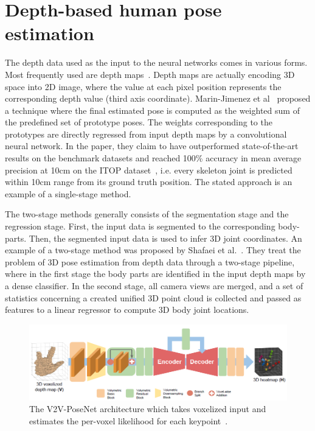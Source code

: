 \section{Depth-based human pose estimation}
\noindent The depth data used as the input to the neural networks comes in various forms. Most frequently used are depth maps~\cite{Malik2018StructureAware3H,Marin18jvcir,inproceedings,Xiong_2019_ICCV}. Depth maps are actually encoding 3D space into 2D image, where the value at each pixel position represents the corresponding depth value (third axis coordinate). Marin-Jimenez et al~\cite{Marin18jvcir} proposed a technique where the final estimated pose is computed as the weighted sum of the predefined set of prototype poses. The weights corresponding to the prototypes are directly regressed from input depth maps by a convolutional neural network. In the paper, they claim to have outperformed state-of-the-art results on the benchmark datasets and reached 100\% accuracy in mean average precision at 10cm on the ITOP dataset~\cite{haque2016viewpoint}, i.e. every skeleton joint is predicted within 10cm range from its ground truth position. The stated approach is an example of a single-stage method.\par
\vspace{5mm}
\noindent The two-stage methods generally consists of the segmentation stage and the regression stage. First, the input data is segmented to the corresponding body-parts. Then, the segmented input data is used to infer 3D joint coordinates. An example of a two-stage method was proposed by Shafaei et al.~\cite{Shafaei16}. They treat the problem of 3D pose estimation from depth data through a two-stage pipeline, where in the first stage the body parts are identified in the input depth maps by a dense classifier. In the second stage, all camera views are merged, and a set of statistics concerning a created unified 3D point cloud is collected and passed as features to a linear regressor to compute 3D body joint locations.\par

\vspace{5mm}
\begin{figure}[H]
\begin{center}
  \includegraphics[width=\textwidth]{images/related_work/v2vposenet.PNG}
  \caption[The V2V-PoseNet architecture~\cite{DBLP:journals/corr/abs-1711-07399}.]{The V2V-PoseNet architecture which takes voxelized input and estimates the per-voxel likelihood for each keypoint~\cite{DBLP:journals/corr/abs-1711-07399}.}
  \label{fig:v2vposenet}
\end{center}
\end{figure}

